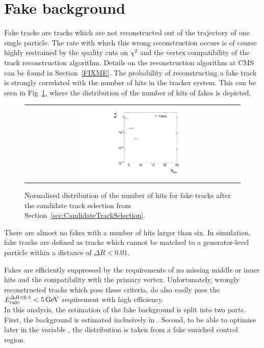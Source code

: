 \section{Fake background}
\label{sec:FakeBkg}
Fake tracks are tracks which are not reconstructed out of the trajectory of one single particle.
The rate with which this wrong reconstruction occurs is of course highly restrained by the quality cuts on $\chi^2$ and the vertex compatibility of the track reconstruction algorithm.
Details on the reconstruction algorithm at CMS can be found in Section~\ref{FIXME}.
The probability of reconstructing a fake track is strongly correlated with the number of hits in the tracker system.
This can be seen in Fig~\ref{fig:NValidFakes}, where the distribution of the number of hits of fakes is depicted.
\begin{figure}[!t]
  \centering 
  \begin{tabular}{c}
    \includegraphics[width=0.49\textwidth]{figures/analysis/Background/NValidForFakes_chiTracksfullSelectionNoTriggerCuts.pdf}
  \end{tabular}
  \caption{Normalised distribution of the number of hits for fake tracks after the candidate track selection from Section~\ref{sec:CandidateTrackSelection}.}
  \label{fig:NValidFakes}
\end{figure}
There are almost no fakes with a number of hits larger than six.
In simulation, fake tracks are defined as tracks which cannot be matched to a generator-level particle within a distance of $\Delta R < 0.01$.

Fakes are efficiently suppressed by the requirements of no missing middle or inner hits and the compatibility with the primary vertex.
Unfortunately, wrongly reconstructed tracks which pass these criteria, do also easily pass the $E^{\Delta R<0.5}_{\text{calo}}<5\,\text{Ge}\kern-0.06667em\text{V}$ requirement with high efficiency.\\

In this analysis, the estimation of the fake background is split into two parts.
First, the background is estimated inclusively in \ias.
Second, to be able to optimise later in the variable \ias, the \ias distribution is taken from a fake enriched control region.

